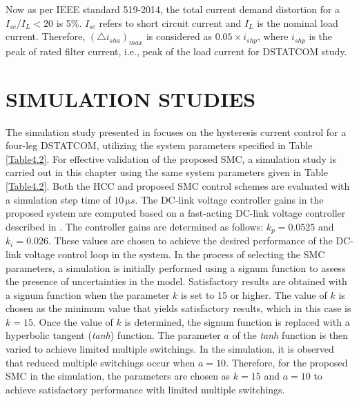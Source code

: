 Now as per IEEE standard 519-2014, the total current demand distortion for a $I_{sc}/I_{L} < 20$ is 5\%. $I_{sc}$ refers to short circuit current and $I_L$ is the nominal load current. Therefore, $(\triangle i_{sha})_{max}$ is considered as $0.05 \times i_{shp}$, where $i_{shp}$ is the peak of rated filter current, i.e., peak of the load current for DSTATCOM study.

\vspace*{-0.5cm}
\section{SIMULATION STUDIES}
The simulation study presented in \cite{8281573} focuses on the hysteresis current control for a four-leg DSTATCOM, utilizing the system parameters specified in Table\,\ref{Table4.2}. For effective validation of the proposed SMC, a simulation study is carried out in this chapter using the same system parameters given in Table\,\ref{Table4.2}. Both the HCC and proposed SMC control schemes are evaluated with a simulation step time of $10\, \si{\micro s}$.
The DC-link voltage controller gains in the proposed system are computed based on a fast-acting DC-link voltage controller described in \cite{5235863}. The controller gains are determined as follows: $k_{p} = 0.0525$ and $k_{i} = 0.026$. These values are chosen to achieve the desired performance of the DC-link voltage control loop in the system. In the process of selecting the SMC parameters, a simulation is initially performed using a signum function to assess the presence of uncertainties in the model. Satisfactory results are obtained with a signum function when the parameter $k$ is set to 15 or higher. The value of $k$ is chosen as the minimum value that yields satisfactory results, which in this case is $k = 15$. Once the value of $k$ is determined, the signum function is replaced with a hyperbolic tangent (\textit{tanh}) function. The parameter $a$ of the \textit{tanh} function is then varied to achieve limited multiple switchings. In the simulation, it is observed that reduced multiple switchings occur when $a = 10$. Therefore, for the proposed SMC in the simulation, the parameters are chosen as $k = 15$ and $a = 10$ to achieve satisfactory performance with limited multiple switchings. 
